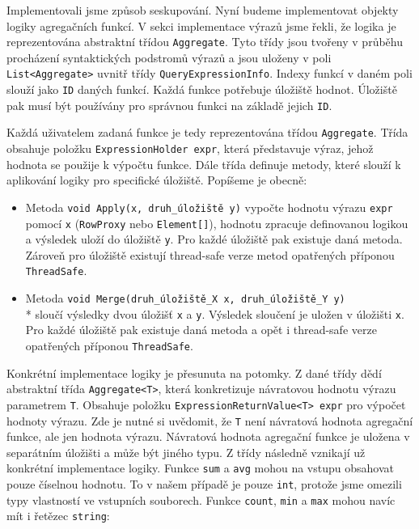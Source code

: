 Implementovali jsme způsob seskupování.
Nyní budeme implementovat objekty logiky agregačních funkcí.
V sekci implementace výrazů jsme řekli, že logika je reprezentována abstraktní třídou \texttt{Aggregate}.
Tyto třídy jsou tvořeny v průběhu procházení syntaktických podstromů výrazů a jsou uloženy v poli \texttt{List<Aggregate>} uvnitř třídy \texttt{QueryExpressionInfo}.
Indexy funkcí v daném poli slouží jako \texttt{ID} daných funkcí.
Každá funkce potřebuje úložiště hodnot.
Úložiště pak musí být používány pro správnou funkci na základě jejich \texttt{ID}.

Každá uživatelem zadaná funkce je tedy reprezentována třídou \texttt{Aggregate}.
Třída obsahuje položku \texttt{ExpressionHolder expr}, která představuje výraz, jehož hodnota se použije k výpočtu funkce.
Dále třída definuje metody, které slouží k aplikování logiky pro specifické úložiště.
Popíšeme je obecně:
\begin{itemize}
\item Metoda \texttt{void Apply(x, druh\_úložiště y)} vypočte hodnotu výrazu \texttt{expr} pomocí \texttt{x} (\texttt{RowProxy} nebo \texttt{Element[]}), hodnotu zpracuje definovanou logikou a výsledek uloží do úložiště \texttt{y}.
Pro každé úložiště pak existuje daná metoda.
Zároveň pro úložiště existují thread-safe verze metod opatřených příponou \texttt{ThreadSafe}.

\item Metoda \texttt{void Merge(druh\_úložiště\_X x, druh\_úložiště\_Y y)}\\* sloučí výsledky dvou úložišť \texttt{x} a \texttt{y}. 
Výsledek sloučení je uložen v úložišti \texttt{x}.
Pro každé úložiště pak existuje daná metoda a opět i thread-safe verze opatřených příponou \texttt{ThreadSafe}.
\end{itemize}
Konkrétní implementace logiky je přesunuta na potomky.
Z dané třídy dědí abstraktní třída \texttt{Aggregate<T>}, která konkretizuje návratovou hodnotu výrazu parametrem \texttt{T}.
Obsahuje položku \texttt{ExpressionReturnValue<T> expr} pro výpočet hodnoty výrazu.
Zde je nutné si uvědomit, že \texttt{T} není návratová hodnota agregační funkce, ale jen hodnota výrazu.
Návratová hodnota agregační funkce je uložena v separátním úložišti a může být jiného typu. 
Z třídy následně vznikají už konkrétní implementace logiky.
Funkce \texttt{sum} a \texttt{avg} mohou na vstupu obsahovat pouze číselnou hodnotu.
To v našem případě je pouze \texttt{int}, protože jsme omezili typy vlastností ve vstupních souborech.
Funkce \texttt{count}, \texttt{min} a \texttt{max} mohou navíc mít i řetězec \texttt{string}:
